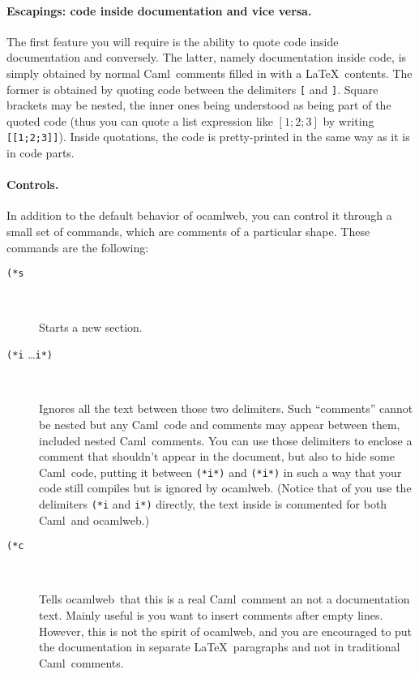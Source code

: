 \documentclass[12pt]{article}
\newcommand{\Caml}{\textsf{Caml}}
\newcommand{\ocamlweb}{\textsf{ocamlweb}}
\begin{document}
\paragraph{Escapings: code inside documentation and vice versa.}
The first feature you will require is the ability to quote code inside
documentation and conversely. The latter, namely documentation inside
code, is simply obtained by normal \Caml\ comments filled in with a
\LaTeX\ contents. The former is obtained by quoting code between the
delimiters \texttt{[} and \texttt{]}. Square brackets may be nested,
the inner ones being understood as being part of the quoted code (thus
you can quote a list expression like $[1;2;3]$ by writing
\texttt{[[1;2;3]]}). Inside quotations, the code is pretty-printed in
the same way as it is in code parts.


\paragraph{Controls.}
In addition to the default behavior of \ocamlweb, you can control it
through a small set of commands, which are comments of a particular
shape. These commands are the following:
\begin{description}

\item[\texttt{(*s}] ~\par
  
  Starts a new section.

\item[\texttt{(*i} \quad\dots\quad \texttt{i*)}] ~\par
  
  Ignores all the text between those two delimiters.  Such ``comments''
  cannot be nested but any \Caml\ code and comments may appear between
  them, included nested \Caml\ comments.  You can use those delimiters
  to enclose a comment that shouldn't appear in the document, but also
  to hide some \Caml\ code, putting it between \texttt{(*i*)} and
  \texttt{(*i*)} in such a way that your code still compiles but is
  ignored by \ocamlweb. (Notice that of you use the delimiters
  \texttt{(*i} and \texttt{i*)} directly, the text inside is commented
  for both \Caml\ and \ocamlweb.)

\item[\texttt{(*c}] ~\par
  
  Tells \ocamlweb\ that this is a real \Caml\ comment an not a
  documentation text. Mainly useful is you want to insert comments
  after empty lines. However, this is not the spirit of \ocamlweb, and
  you are encouraged to put the documentation in separate \LaTeX\ 
  paragraphs and not in traditional \Caml\ comments.

\end{description}
\end{document}
